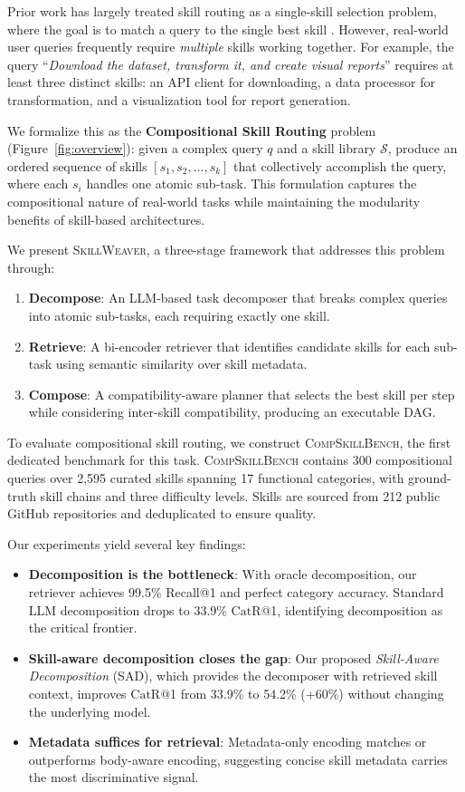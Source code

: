 \documentclass[11pt]{article}
\newcommand{\system}{\textsc{SkillWeaver}}
\newcommand{\benchmark}{\textsc{CompSkillBench}}
\newcommand{\catrecall}{\text{CatR}}
\begin{document}
Prior work has largely treated skill routing as a single-skill selection problem, where the goal is to match a query to the single best skill \cite{xu2025skillrouter}.
However, real-world user queries frequently require \emph{multiple} skills working together.
For example, the query ``\textit{Download the dataset, transform it, and create visual reports}'' requires at least three distinct skills: an API client for downloading, a data processor for transformation, and a visualization tool for report generation.

We formalize this as the \textbf{Compositional Skill Routing} problem (Figure~\ref{fig:overview}):
given a complex query $q$ and a skill library $\mathcal{S}$, produce an ordered sequence of skills $[s_1, s_2, \ldots, s_k]$ that collectively accomplish the query, where each $s_i$ handles one atomic sub-task.
This formulation captures the compositional nature of real-world tasks while maintaining the modularity benefits of skill-based architectures.

We present \system{}, a three-stage framework that addresses this problem through:
\begin{enumerate}[nosep,leftmargin=*]
  \item \textbf{Decompose}: An LLM-based task decomposer that breaks complex queries into atomic sub-tasks, each requiring exactly one skill.
  \item \textbf{Retrieve}: A bi-encoder retriever that identifies candidate skills for each sub-task using semantic similarity over skill metadata.
  \item \textbf{Compose}: A compatibility-aware planner that selects the best skill per step while considering inter-skill compatibility, producing an executable DAG.
\end{enumerate}

To evaluate compositional skill routing, we construct \benchmark{}, the first dedicated benchmark for this task.
\benchmark{} contains 300 compositional queries over 2{,}595 curated skills spanning 17 functional categories, with ground-truth skill chains and three difficulty levels.
Skills are sourced from 212 public GitHub repositories and deduplicated to ensure quality.

Our experiments yield several key findings:
\begin{itemize}[nosep,leftmargin=*]
  \item \textbf{Decomposition is the bottleneck}: With oracle decomposition, our retriever achieves 99.5\% Recall@1 and perfect category accuracy. Standard LLM decomposition drops to 33.9\% $\catrecall$@1, identifying decomposition as the critical frontier.
  \item \textbf{Skill-aware decomposition closes the gap}: Our proposed \emph{Skill-Aware Decomposition} (SAD), which provides the decomposer with retrieved skill context, improves $\catrecall$@1 from 33.9\% to 54.2\% (+60\%) without changing the underlying model.
  \item \textbf{Metadata suffices for retrieval}: Metadata-only encoding matches or outperforms body-aware encoding, suggesting concise skill metadata carries the most discriminative signal.
\end{itemize}
\end{document}
